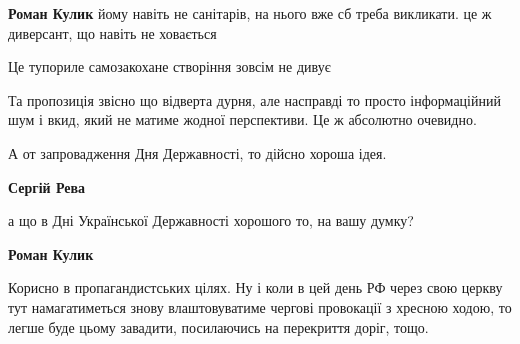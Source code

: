 \begin{itemize}
\begin{itemize}
 
\textbf{Роман Кулик} йому навіть не санітарів, на нього вже сб треба викликати. це ж диверсант, що навіть не ховається

 
Це тупориле самозакохане створіння зовсім не дивує

\end{itemize}

 

Та пропозиція звісно що відверта дурня, але насправді то просто інформаційний
шум і вкид, який не матиме жодної перспективи. Це ж абсолютно очевидно.

А от запровадження Дня Державності, то дійсно хороша ідея.

\begin{itemize}
 
\textbf{Сергій Рева} 

а що в Дні Української Державності хорошого то, на вашу думку?

 
\textbf{Роман Кулик} 

Корисно в пропагандистських цілях. Ну і коли в цей день РФ через свою церкву
тут намагатиметься знову влаштовуватиме чергові провокації з хресною ходою, то
легше буде цьому завадити, посилаючись на перекриття доріг, тощо.




\end{itemize}
\end{itemize}
